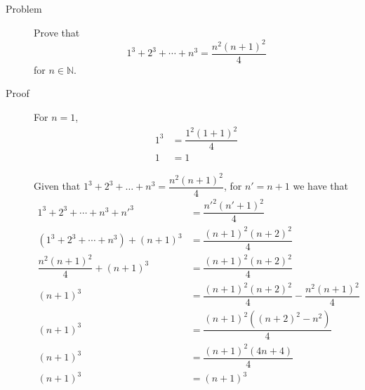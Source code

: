 \begin{description}
\item[Problem] Prove that
$$1^3 + 2^3 + \cdots + n^3 = \dfrac {n^2 (n+1)^2} 4$$
for $n \in \mathbb{N}$.

\item[Proof] For $n = 1$,
\begin{equation*}\begin{aligned}
1^3 &= \dfrac{1^2 (1 + 1)^2}{4} \\
1   &= 1
\end{aligned}\end{equation*}

Given that $1^3 + 2^3 + \ldots + n^3 = \dfrac{n^2(n+1)^2}{4}$, for $n' = n + 1$
we have that
\begin{equation*}\begin{aligned}
1^3 + 2^3 + \cdots + n^3 + n'^3 &= \dfrac{n'^2 (n' + 1)^2}{4} \\
(1^3 + 2^3 + \cdots + n^3) + (n+1)^3 &= \dfrac{(n+1)^2 (n+2)^2} 4 \\
\dfrac{n^2(n+1)^2}{4} + (n+1)^3 &= \dfrac{(n+1)^2 (n+2)^2} 4 \\
(n+1)^3 &= \dfrac{(n+1)^2 (n+2)^2} 4 - \dfrac{n^2(n+1)^2}{4} \\
(n+1)^3 &= \dfrac{(n+1)^2 \left((n+2)^2 - n^2\right)} 4 \\
(n+1)^3 &= \dfrac{(n+1)^2 \left(4n + 4\right)} 4 \\
(n+1)^3 &= (n+1)^3 \\
\end{aligned}\end{equation*}

\end{description}

